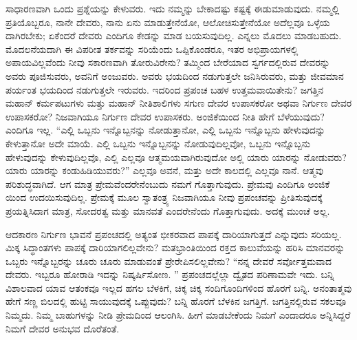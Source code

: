 \vskip 6pt

ಸಾಧಾರಣವಾಗಿ ಒಂದು ಪ್ರಶ್ನೆಯನ್ನು ಕೇಳುವರು. ಇದು ನಮ್ಮನ್ನು ಬೇಕಾದಷ್ಟು ಕಷ್ಟಕ್ಕೆ ಈಡುಮಾಡುವುದು. ನಮ್ಮಲ್ಲಿ ಪ್ರತಿಯೊಬ್ಬರೂ, ನಾನೇ ದೇವರು, ನಾನು ಏನು ಮಾಡುತ್ತೇನೆಯೋ, ಆಲೋಚಿಸುತ್ತೇನೆಯೋ ಅದೆಲ್ಲವೂ ಒಳ್ಳೆಯ ದಾಗಿರಬೇಕು; ಏಕೆಂದರೆ ದೇವರು ಎಂದಿಗೂ ಕೇಡನ್ನು ಮಾಡ ಬಯಸುವುದಿಲ್ಲ. ಎನ್ನಲು ಮೊದಲು ಮಾಡಬಹುದು. ಮೊದಲನೆಯದಾಗಿ ಈ ವಿಪರೀತ ತರ್ಕವನ್ನು ಸರಿಯೆಂದು ಒಪ್ಪಿಕೊಂಡರೂ, ಇತರ ಅಭಿಪ್ರಾಯಗಳಲ್ಲಿ ಅಪಾಯವಿಲ್ಲವೆಂದು ನೀವು ಸಕಾರಣವಾಗಿ ತೋರುವಿರೇನು? ತಮ್ಮಿಂದ ಬೇರೆಯಾದ ಸ್ವರ್ಗದಲ್ಲಿರುವ ದೇವರನ್ನು ಅವರು ಪೂಜಿಸುವರು, ಅವನಿಗೆ ಅಂಜುವರು. ಅವರು ಭಯದಿಂದ ನಡುಗುತ್ತಲೇ ಜನಿಸಿರುವರು, ಮತ್ತು ಜೀವಮಾನ ಪರ್ಯಂತ ಭಯದಿಂದ ನಡುಗುತ್ತಲೇ ಇರುವರು. ಇದರಿಂದ ಪ್ರಪಂಚ ಬಹಳ ಉತ್ತಮವಾಯಿತೇನು? ಜಗತ್ತಿನ ಮಹಾನ್​ ಕರ್ಮಪಟುಗಳು ಮತ್ತು ಮಹಾನ್​ ನೀತಿಶಾಲಿಗಳು ಸಗುಣ ದೇವರ ಉಪಾಸಕರೋ ಅಥವಾ ನಿರ್ಗುಣ ದೇವರ ಉಪಾಸಕರೋ? ನಿಜವಾಗಿಯೂ ನಿರ್ಗುಣ ದೇವರ ಉಪಾಸಕರು. ಅಂಜಿಕೆಯಿಂದ ನೀತಿ ಹೇಗೆ ಬೆಳೆಯುವುದು? ಎಂದಿಗೂ ಇಲ್ಲ. “ಎಲ್ಲಿ ಒಬ್ಬನು ಇನ್ನೊಬ್ಬನನ್ನು ನೋಡುತ್ತಾನೋ, ಎಲ್ಲಿ ಒಬ್ಬನು ಇನ್ನೊಬ್ಬನು ಹೇಳುವುದನ್ನು ಕೇಳುತ್ತಾನೋ ಅದೇ ಮಾಯೆ. ಎಲ್ಲಿ ಒಬ್ಬನು ಇನ್ನೊಬ್ಬನನ್ನು ನೋಡುವುದಿಲ್ಲವೋ, ಒಬ್ಬನು ಇನ್ನೊಬ್ಬನು ಹೇಳುವುದನ್ನು ಕೇಳುವುದಿಲ್ಲವೊ, ಎಲ್ಲಿ ಎಲ್ಲವೂ ಆತ್ಮಮಯವಾಗಿರುವುದೋ ಅಲ್ಲಿ ಯಾರು ಯಾರನ್ನು ನೋಡುವರು? ಯಾರು ಯಾರನ್ನು ಕಂಡುಹಿಡಿಯುವರು?” ಎಲ್ಲವೂ ಅವನೆ, ಮತ್ತು ಅದೇ ಕಾಲದಲ್ಲಿ ಎಲ್ಲವೂ ನಾನೆ. ಆತ್ಮವು ಪರಿಶುದ್ಧವಾಗಿದೆ. ಆಗ ಮಾತ್ರ ಪ್ರೇಮವೆಂದರೇನೆಂಬುದು ನಮಗೆ ಗೊತ್ತಾಗುವುದು. ಪ್ರೇಮವು ಎಂದಿಗೂ ಅಂಜಿಕೆ ಯಿಂದ ಉದಯಿಸುವುದಿಲ್ಲ. ಪ್ರೇಮಕ್ಕೆ ಮೂಲ ಸ್ವಾತಂತ್ರ್ಯ ನಿಜವಾಗಿಯೂ ನೀವು ಪ್ರಪಂಚವನ್ನು ಪ್ರೀತಿಸುವುದಕ್ಕೆ ಪ್ರಯತ್ನಿಸಿದಾಗ ಮಾತ್ರ, ಸೋದರತ್ವ ಮತ್ತು ಮಾನವತೆ ಎಂದರೇನೆಂದು ಗೊತ್ತಾಗುವುದು. ಅದಕ್ಕೆ ಮುಂಚೆ ಅಲ್ಲ. 

\vskip 6pt

ಆದಕಾರಣ ನಿರ್ಗುಣ ಭಾವನೆ ಪ್ರಪಂಚದಲ್ಲಿ ಅತ್ಯಂತ ಭೀಕರವಾದ ಪಾಪಕ್ಕೆ ದಾರಿಯಾಗುತ್ತದೆ ಎನ್ನುವುದು ಸರಿಯಲ್ಲ. ಮಿಕ್ಕ ಸಿದ್ಧಾಂತಗಳು ಪಾಪಕ್ಕೆ ದಾರಿಯಾಗಲಿಲ್ಲವೇನು? ಮತಭ್ರಾಂತಿಯಿಂದ ರಕ್ತದ ಕಾಲುವೆಯನ್ನು ಹರಿಸಿ ಮಾನವರನ್ನು ಒಬ್ಬರು ಇನ್ನೊಬ್ಬರನ್ನು ಚೂರು ಚೂರು ಮಾಡುವಂತೆ ಪ್ರೇರೇಪಿಸಲಿಲ್ಲವೇನು? “ನನ್ನ ದೇವರೆ ಸರ್ವೋತ್ತಮವಾದ ದೇವರು. ಇಬ್ಬರೂ ಹೋರಾಡಿ ಇದನ್ನು ನಿಷ್ಕರ್ಷಿಸೋಣ. ” ಪ್ರಪಂಚದಲ್ಲೆಲ್ಲಾ ದ್ವೈತದ ಪರಿಣಾಮವೇ ಇದು. ಬನ್ನಿ ವಿಶಾಲವಾದ ಯಾವ ಆತಂಕವೂ ಇಲ್ಲದ ಹಗಲ ಬೆಳಕಿಗೆ, ಚಿಕ್ಕ ಚಿಕ್ಕ ಸಂದಿಗೊಂದಿಗಳಿಂದ ಹೊರಗೆ ಬನ್ನಿ. ಅನಂತಾತ್ಮವು ಹೇಗೆ ಸಣ್ಣ ಬಿಲದಲ್ಲಿ ಹುಟ್ಟಿ ಸಾಯುವುದಕ್ಕೆ ಒಪ್ಪುವುದು? ಬನ್ನಿ ಹೊರಗೆ ಬೆಳಕಿನ ಜಗತ್ತಿಗೆ. ಜಗತ್ತಿನಲ್ಲಿರುವ ಸಕಲವೂ ನಿಮ್ಮದು. ನಿಮ್ಮ ಬಾಹುಗಳನ್ನು ನೀಡಿ ಪ್ರೇಮದಿಂದ ಆಲಂಗಿಸಿ. ಹೀಗೆ ಮಾಡಬೇಕೆಂದು ನಿಮಗೆ ಎಂದಾದರೂ ಅನ್ನಿಸಿದ್ದರೆ ನಿಮಗೆ ದೇವರ ಅನುಭವ ದೊರೆತಂತೆ. 

\vskip 6pt

